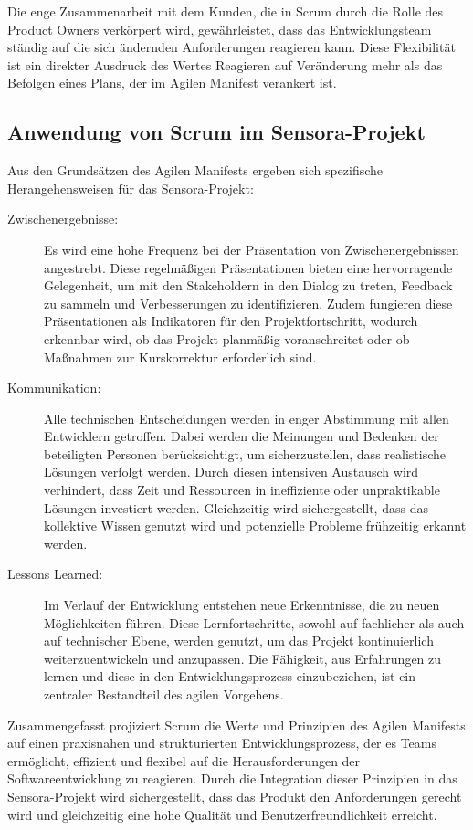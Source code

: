 Die enge Zusammenarbeit mit dem Kunden, die in Scrum durch die Rolle des Product Owners verkörpert wird, gewährleistet, dass das Entwicklungsteam ständig auf die sich ändernden Anforderungen reagieren kann. Diese Flexibilität ist ein direkter Ausdruck des Wertes \glqq Reagieren auf Veränderung mehr als das Befolgen eines Plans\grqq, der im Agilen Manifest verankert ist.


\subsection{Anwendung von Scrum im Sensora-Projekt}
Aus den Grundsätzen des Agilen Manifests ergeben sich spezifische Herangehensweisen für das Sensora-Projekt:
\begin{description}
    \item[Zwischenergebnisse:] Es wird eine hohe Frequenz bei der Präsentation von Zwischenergebnissen angestrebt. Diese regelmäßigen Präsentationen bieten eine hervorragende Gelegenheit, um mit den Stakeholdern in den Dialog zu treten, Feedback zu sammeln und Verbesserungen zu identifizieren. Zudem fungieren diese Präsentationen als Indikatoren für den Projektfortschritt, wodurch erkennbar wird, ob das Projekt planmäßig voranschreitet oder ob Maßnahmen zur Kurskorrektur erforderlich sind.
    \item[Kommunikation:] Alle technischen Entscheidungen werden in enger Abstimmung mit allen Entwicklern getroffen. Dabei werden die Meinungen und Bedenken der beteiligten Personen berücksichtigt, um sicherzustellen, dass realistische Lösungen verfolgt werden. Durch diesen intensiven Austausch wird verhindert, dass Zeit und Ressourcen in ineffiziente oder unpraktikable Lösungen investiert werden. Gleichzeitig wird sichergestellt, dass das kollektive Wissen genutzt wird und potenzielle Probleme frühzeitig erkannt werden.
    \item[Lessons Learned:] Im Verlauf der Entwicklung entstehen neue Erkenntnisse, die zu neuen Möglichkeiten führen. Diese Lernfortschritte, sowohl auf fachlicher als auch auf technischer Ebene, werden genutzt, um das Projekt kontinuierlich weiterzuentwickeln und anzupassen. Die Fähigkeit, aus Erfahrungen zu lernen und diese in den Entwicklungsprozess einzubeziehen, ist ein zentraler Bestandteil des agilen Vorgehens.
\end{description}

Zusammengefasst projiziert Scrum die Werte und Prinzipien des Agilen Manifests auf einen praxisnahen und strukturierten Entwicklungsprozess, der es Teams ermöglicht, effizient und flexibel auf die Herausforderungen der Softwareentwicklung zu reagieren. Durch die Integration dieser Prinzipien in das Sensora-Projekt wird sichergestellt, dass das Produkt den Anforderungen gerecht wird und gleichzeitig eine hohe Qualität und Benutzerfreundlichkeit erreicht.
